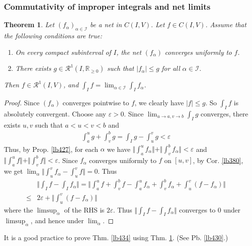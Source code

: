 \documentclass[12pt,b5paper,notitlepage]{article}
\theoremstyle{definition}
\theoremstyle{plain}
\newtheorem{thm}[df]{Theorem}
\newcommand{\scr}{\mathscr}
\newcommand{\Rbb}{\mathbb R}
\newcommand{\dps}{\displaystyle}
\newcommand{\eps}{\varepsilon}
\numberwithin{equation}{section}
\begin{document}
\subsubsection{Commutativity of improper integrals and net limits}



\begin{thm}\label{lb428}
Let $(f_\alpha)_{\alpha\in\scr I}$ be a net in $C(I,V)$. Let $f\in C(I,V)$. Assume that the following conditions are true:
\begin{enumerate}[label=(\arabic*)]
\item On every compact subinterval of $I$, the net $(f_\alpha)$ converges uniformly to $f$.
\item There exists $g\in\scr R^1(I,\Rbb_{\geq0})$ such that $|f_\alpha|\leq g$ for all $\alpha\in\scr I$.
\end{enumerate}
Then $f\in\scr R^1(I,V)$, and $\dps\int_If=\lim_{\alpha\in\scr I}\int_If_\alpha$.
\end{thm}


\begin{proof}
Since $(f_\alpha)$ converges pointwise to $f$, we clearly have $|f|\leq g$. So $\int_If$ is absolutely convergent. Choose any $\eps>0$. Since $\lim_{u\rightarrow a,v\rightarrow b}\int_Ig$ converges, there exists $u,v$ such that $a<u<v<b$ and
\begin{align*}
\int_a^ug+\int_v^bg=\int_Ig-\int_u^v g<\eps
\end{align*}
Thus, by Prop. \ref{lb427}, for each $\alpha$ we have $\Vert\int_a^uf_\alpha\Vert+\Vert\int_v^bf_\alpha\Vert<\eps$ and $\Vert\int_a^uf\Vert+\Vert\int_v^bf\Vert<\eps$. Since $f_\alpha$ converges uniformly to $f$ on $[u,v]$, by Cor. \ref{lb380}, we get $\lim_\alpha\Vert \int_u^vf_\alpha-\int_u^vf\Vert=0$. Thus
\begin{align*}
&\Big\Vert \int_If-\int_If_\alpha\Big\Vert=\Big\Vert \int_a^uf+\int_v^b f-\int_a^u f_\alpha+\int_v^b f_\alpha+\int_u^v(f-f_\alpha)\Big\Vert\\
\leq&2\eps+\Big\Vert\int_u^v(f-f_\alpha)\Big\Vert
\end{align*}
where the $\limsup_\alpha$ of the RHS is $2\eps$. Thus $\Vert\int_If-\int_If_\alpha\Vert$ converges to $0$ under $\limsup_\alpha$, and hence under $\lim_\alpha$.
\end{proof}

It is a good practice to prove Thm. \ref{lb434} using Thm. \ref{lb428}. (See Pb. \ref{lb430}.)
\end{document}
